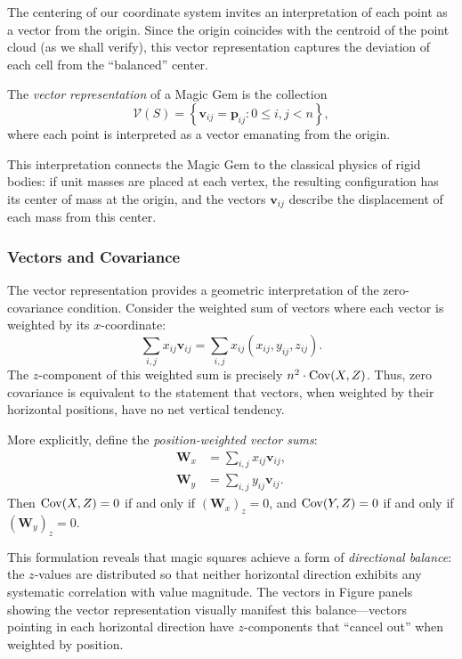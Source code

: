 The centering of our coordinate system invites an interpretation of each point as a vector from the origin.
Since the origin coincides with the centroid of the point cloud (as we shall verify),
this vector representation captures the deviation of each cell from the ``balanced'' center.

\begin{definition}
The \emph{vector representation} of a Magic Gem is the collection
\[
\mathcal{V}(S) = \left\{ \mathbf{v}_{ij} = \mathbf{p}_{ij} : 0 \leq i, j < n \right\},
\]
where each point is interpreted as a vector emanating from the origin.
\end{definition}

This interpretation connects the Magic Gem to the classical physics of rigid bodies:
if unit masses are placed at each vertex, the resulting configuration has its center of mass at the origin,
and the vectors $\mathbf{v}_{ij}$ describe the displacement of each mass from this center.

\subsubsection{Vectors and Covariance}

The vector representation provides a geometric interpretation of the zero-covariance condition.
Consider the weighted sum of vectors where each vector is weighted by its $x$-coordinate:
\[
\sum_{i,j} x_{ij} \mathbf{v}_{ij} = \sum_{i,j} x_{ij} (x_{ij}, y_{ij}, z_{ij}).
\]
The $z$-component of this weighted sum is precisely $n^2 \cdot \mathrm{Cov}(X, Z)$.
Thus, zero covariance is equivalent to the statement that vectors, 
when weighted by their horizontal positions, have no net vertical tendency.

More explicitly, define the \emph{position-weighted vector sums}:
\begin{align}
\mathbf{W}_x &= \sum_{i,j} x_{ij} \mathbf{v}_{ij}, \label{eq:weighted_x} \\
\mathbf{W}_y &= \sum_{i,j} y_{ij} \mathbf{v}_{ij}. \label{eq:weighted_y}
\end{align}
Then $\mathrm{Cov}(X, Z) = 0$ if and only if $(\mathbf{W}_x)_z = 0$, 
and $\mathrm{Cov}(Y, Z) = 0$ if and only if $(\mathbf{W}_y)_z = 0$.

This formulation reveals that magic squares achieve a form of \emph{directional balance}:
the $z$-values are distributed so that neither horizontal direction 
exhibits any systematic correlation with value magnitude.
The vectors in Figure panels showing the vector representation 
visually manifest this balance---vectors pointing in each horizontal direction 
have $z$-components that ``cancel out'' when weighted by position.

